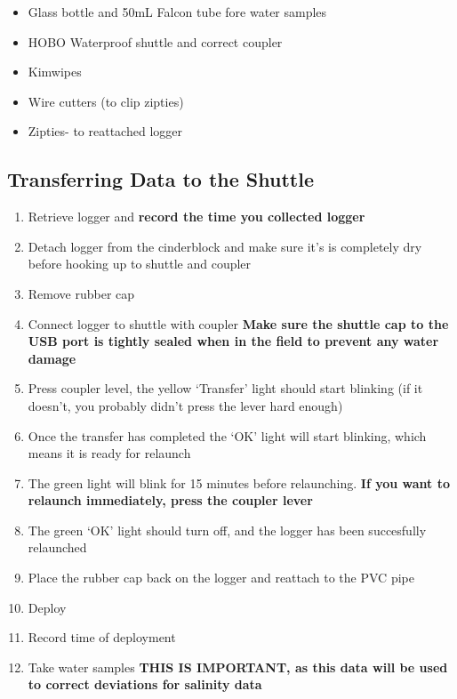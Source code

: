 \documentclass[
  letterpaper,
  DIV=11,
  numbers=noendperiod]{scrreprt}
\begin{document}
\begin{itemize}
\item
  Glass bottle and 50mL Falcon tube fore water samples
\item
  HOBO Waterproof shuttle and correct coupler
\item
  Kimwipes
\item
  Wire cutters (to clip zipties)
\item
  Zipties- to reattached logger
\end{itemize}

\hypertarget{transferring-data-to-the-shuttle}{%
\subsection*{\texorpdfstring{\textbf{Transferring Data to the
Shuttle}}{Transferring Data to the Shuttle}}\label{transferring-data-to-the-shuttle}}

\begin{enumerate}
\def\labelenumi{\arabic{enumi}.}
\item
  Retrieve logger and \textbf{record the time you collected logger}
\item
  Detach logger from the cinderblock and make sure it's is completely
  dry before hooking up to shuttle and coupler
\item
  Remove rubber cap
\item
  Connect logger to shuttle with coupler \textbf{Make sure the shuttle
  cap to the USB port is tightly sealed when in the field to prevent any
  water damage}
\item
  Press coupler level, the yellow `Transfer' light should start blinking
  (if it doesn't, you probably didn't press the lever hard enough)
\item
  Once the transfer has completed the `OK' light will start blinking,
  which means it is ready for relaunch
\item
  The green light will blink for 15 minutes before relaunching.
  \textbf{If you want to relaunch immediately, press the coupler lever}
\item
  The green `OK' light should turn off, and the logger has been
  succesfully relaunched
\item
  Place the rubber cap back on the logger and reattach to the PVC pipe
\item
  Deploy
\item
  Record time of deployment
\item
  Take water samples \textbf{THIS IS IMPORTANT, as this data will be
  used to correct deviations for salinity data}
\end{enumerate}
\end{document}
